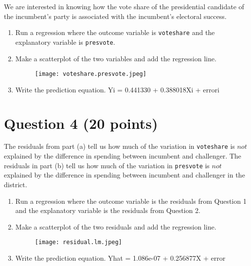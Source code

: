 \documentclass[12pt,letterpaper]{article}
\begin{document}
\noindent We are interested in knowing how the vote share of the presidential candidate of the incumbent's party is associated with the incumbent's electoral success.
	\vspace{.25cm}
	\begin{enumerate}
		\item Run a regression where the outcome variable is \texttt{voteshare} and the explanatory variable is \texttt{presvote}.
			\vspace{1cm}
 	
\vspace{.5cm}
		\item Make a scatterplot of the two variables and add the regression line. 
			\vspace{1cm}
 
\begin{figure} [H]
	\texttt{[image: voteshare.presvote.jpeg]}
\end{figure}
\vspace{.5cm}
		\item Write the prediction equation.
\noindent Yi = 0.441330  + 0.388018Xi + errori
	\end{enumerate}
	

\newpage	
\section*{Question 4 (20 points)}
\noindent The residuals from part (a) tell us how much of the variation in \texttt{voteshare} is $not$ explained by the difference in spending between incumbent and challenger. The residuals in part (b) tell us how much of the variation in \texttt{presvote} is $not$ explained by the difference in spending between incumbent and challenger in the district.
	\begin{enumerate}
		\item Run a regression where the outcome variable is the residuals from Question 1 and the explanatory variable is the residuals from Question 2.	\vspace{1cm}
 
\vspace{.5cm}
		\item Make a scatterplot of the two residuals and add the regression line. 	\vspace{1cm}
 
\begin{figure} [H]
	\texttt{[image: residual.lm.jpeg]}
\end{figure}
\vspace{.5cm}
		\item Write the prediction equation.
	\noindent Yhat =  1.086e-07 + 0.256877X + error
	\end{enumerate}
	
\end{document}
